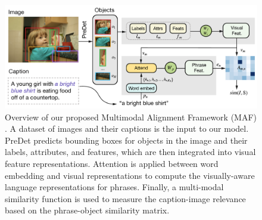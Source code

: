 \begin{figure}
  \centering
  \includegraphics[width=.8\textwidth]{figures/maf-model.png}
  \caption[Multimodal Alignment Framework model overview]{Overview
  of our proposed Multimodal Alignment Framework (MAF)
  \cite{wang2020maf}. A dataset of images and their captions is the
  input to our model. PreDet predicts bounding boxes for objects in
  the image and their labels, attributes, and features, which are
  then integrated into visual feature representations. Attention is
  applied between word embedding and visual representations to
  compute the visually-aware language representations for phrases.
  Finally, a multi-modal similarity function is used to measure the
  caption-image relevance based on the phrase-object similarity
  matrix.}
  \label{fig:maf-model}
\end{figure}

